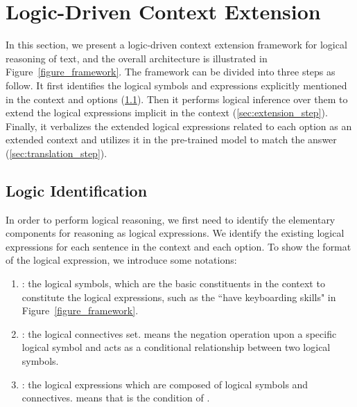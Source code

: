 \documentclass[11pt,a4paper]{article}
\begin{document}
\section{Logic-Driven Context Extension}
In this section, we present a logic-driven context extension framework for logical reasoning of text, and the overall architecture is illustrated in Figure~\ref{figure_framework}. 
The framework can be divided into three steps as follow. It first identifies the logical symbols and expressions explicitly mentioned in the context and options
(\cref{sec:identification_step}). Then it performs logical inference over them to extend the logical expressions implicit in the context (\cref{sec:extension_step}). Finally, it verbalizes the extended logical expressions related to each option as an extended context and utilizes it in the pre-trained model to match the answer (\cref{sec:translation_step}).


\subsection{Logic Identification}
\label{sec:identification_step}
In order to perform logical reasoning, we first need to identify the elementary components for reasoning as logical expressions. 
We identify the existing logical expressions for each sentence in the context and each option. 
To show the format of the logical expression, we introduce some notations:
\begin{enumerate}[(1)]
    \setlength{\itemsep}{1pt}
    \item : the logical symbols, which are the basic constituents in the context to constitute the logical expressions, such as the ``have keyboarding skills" in Figure~\ref{figure_framework}.
    \item : the logical connectives set.  means the negation operation upon a specific logical symbol and  acts as a conditional relationship between two logical symbols.
\item : the logical expressions which are composed of logical symbols and connectives.  means that  is the condition of .
\end{enumerate}
\end{document}

